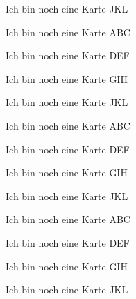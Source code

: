 \documentclass[a7paper,7pt,print,grid=both,flip]{kartei}
\begin{document}
	\begin{karte}{Ich bin noch eine Karte}
		JKL
	\end{karte}
	\begin{karte}{Ich bin noch eine Karte}
		ABC
	\end{karte}
	\begin{karte}{Ich bin noch eine Karte}
		DEF
	\end{karte}
	\begin{karte}{Ich bin noch eine Karte}
		GIH
	\end{karte}
	\begin{karte}{Ich bin noch eine Karte}
		JKL
	\end{karte}
	\begin{karte}{Ich bin noch eine Karte}
		ABC
	\end{karte}
	\begin{karte}{Ich bin noch eine Karte}
		DEF
	\end{karte}
	\begin{karte}{Ich bin noch eine Karte}
		GIH
	\end{karte}
	\begin{karte}{Ich bin noch eine Karte}
		JKL
	\end{karte}
	\begin{karte}{Ich bin noch eine Karte}
		ABC
	\end{karte}
	\begin{karte}{Ich bin noch eine Karte}
		DEF
	\end{karte}
	\begin{karte}{Ich bin noch eine Karte}
		GIH
	\end{karte}
	\begin{karte}{Ich bin noch eine Karte}
		JKL
	\end{karte}
\end{document}

